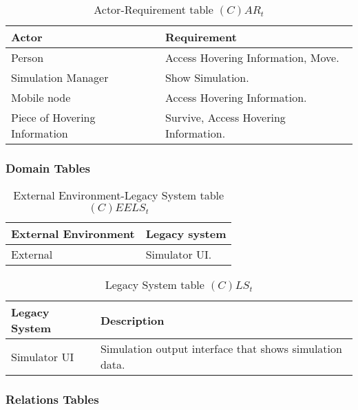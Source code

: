 \begin{table}[H]
	\centering
	\begin{tabular}{|p{4cm}|p{8cm}|}
			\hline
			\textbf{Actor} & \textbf{Requirement} \\
			\hline
			Person & Access Hovering Information, Move. \\
			\hline
			Simulation Manager & Show Simulation. \\
			\hline
			Mobile node & Access Hovering Information. \\
			\hline
			Piece of Hovering Information & Survive, Access Hovering Information. \\
			\hline
		\end{tabular}
	\caption{Actor-Requirement table $(C)AR_t$}
	\label{tab:cart}
\end{table}

\subsubsection{Domain Tables}

\begin{table}[H]
	\centering
	\begin{tabular}{|p{4cm}|p{8cm}|}
			\hline
			\textbf{External Environment} & \textbf{Legacy system} \\
			\hline
			External & Simulator UI. \\
			\hline
		\end{tabular}
	\caption{External Environment-Legacy System table $(C)EELS_t$}
	\label{tab:ceelst}
\end{table}

\begin{table}[H]
	\centering
	\begin{tabular}{|p{4cm}|p{8cm}|}
			\hline
			\textbf{Legacy System} & \textbf{Description} \\
			\hline
			Simulator UI & Simulation output interface that shows simulation data. \\
			\hline
		\end{tabular}
	\caption{Legacy System table $(C)LS_t$}
	\label{tab:clst}
\end{table}

\subsubsection{Relations Tables}

